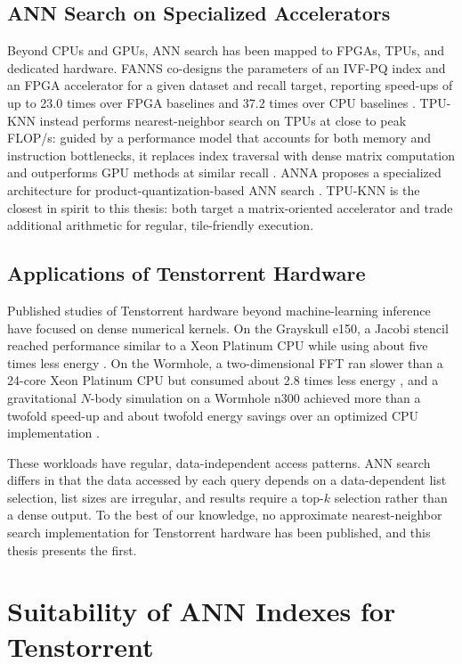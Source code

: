 \subsection{ANN Search on Specialized Accelerators}

Beyond CPUs and GPUs, ANN search has been mapped to FPGAs, TPUs, and dedicated hardware. FANNS co-designs the parameters of an IVF-PQ index and an FPGA accelerator for a given dataset and recall target, reporting speed-ups of up to 23.0 times over FPGA baselines and 37.2 times over CPU baselines \cite{fanns}. TPU-KNN instead performs nearest-neighbor search on TPUs at close to peak FLOP/s: guided by a performance model that accounts for both memory and instruction bottlenecks, it replaces index traversal with dense matrix computation and outperforms GPU methods at similar recall \cite{tpu_knn}. ANNA proposes a specialized architecture for product-quantization-based ANN search \cite{anna}. TPU-KNN is the closest in spirit to this thesis: both target a matrix-oriented accelerator and trade additional arithmetic for regular, tile-friendly execution.

\subsection{Applications of Tenstorrent Hardware}

Published studies of Tenstorrent hardware beyond machine-learning inference have focused on dense numerical kernels. On the Grayskull e150, a Jacobi stencil reached performance similar to a Xeon Platinum CPU while using about five times less energy \cite{brown_grayskull_stencil}. On the Wormhole, a two-dimensional FFT ran slower than a 24-core Xeon Platinum CPU but consumed about 2.8 times less energy \cite{brown_wormhole_fft}, and a gravitational \(N\)-body simulation on a Wormhole n300 achieved more than a twofold speed-up and about twofold energy savings over an optimized CPU implementation \cite{almerol_wormhole_nbody}.

These workloads have regular, data-independent access patterns. ANN search differs in that the data accessed by each query depends on a data-dependent list selection, list sizes are irregular, and results require a top-\(k\) selection rather than a dense output. To the best of our knowledge, no approximate nearest-neighbor search implementation for Tenstorrent hardware has been published, and this thesis presents the first.

\section{Suitability of ANN Indexes for Tenstorrent}
\label{sec:index-suitability}

